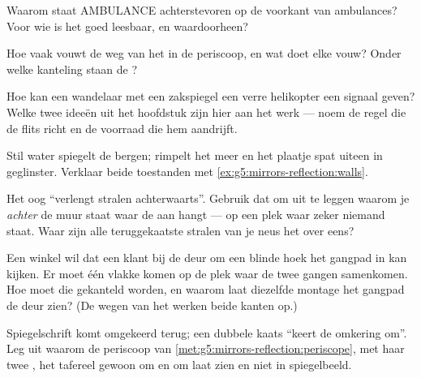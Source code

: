 \begin{exercise}[$\star$]\label{exo:g5:mirrors-reflection:5}
Waarom staat AMBULANCE achterstevoren op de voorkant van ambulances?
Voor wie is het goed leesbaar, en waardoorheen?
\end{exercise}

\begin{exercise}[$\star$]\label{exo:g5:mirrors-reflection:6}
Hoe vaak vouwt de weg van het  in de periscoop, en wat doet elke
vouw? Onder welke kanteling staan de ?
\end{exercise}

\begin{exercise}[$\star$]\label{exo:g5:mirrors-reflection:7}
Hoe kan een wandelaar met een zakspiegel een verre helikopter een
signaal geven? Welke twee ideeën uit het hoofdstuk zijn hier aan het
werk --- noem de regel die de flits richt en de voorraad die hem
aandrijft.
\end{exercise}

\begin{exercise}[$\star$]\label{exo:g5:mirrors-reflection:8}
Stil water spiegelt de bergen;  rimpelt het meer en het plaatje
spat uiteen in geglinster. Verklaar beide toestanden met
\cref{ex:g5:mirrors-reflection:walls}.
\end{exercise}

\begin{exercise}[$\star\star$]\label{exo:g5:mirrors-reflection:9}
Het oog ``verlengt stralen achterwaarts''. Gebruik dat om uit te
leggen waarom je  \emph{achter} de muur staat waar de
 aan hangt --- op een plek waar zeker niemand staat. Waar
zijn alle teruggekaatste stralen van je neus het over eens?
\end{exercise}

\begin{exercise}[$\star\star$]\label{exo:g5:mirrors-reflection:10}
Een winkel wil dat een klant bij de deur om een blinde hoek het
gangpad in kan kijken. Er moet één vlakke  komen op de plek
waar de twee gangen samenkomen. Hoe moet die gekanteld worden, en
waarom laat diezelfde montage het gangpad de deur zien? (De wegen van
het  werken beide kanten op.)
\end{exercise}

\begin{exercise}[$\star\star$]\label{exo:g5:mirrors-reflection:11}
Spiegelschrift komt omgekeerd terug; een dubbele kaats ``keert de
omkering om''. Leg uit waarom de periscoop van
\cref{met:g5:mirrors-reflection:periscope}, met haar twee
, het tafereel gewoon om en om laat zien en niet in
spiegelbeeld.
\end{exercise}
